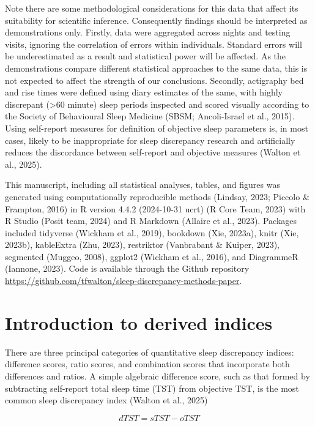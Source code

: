 \documentclass[
]{article}
\begin{document}
Note there are some methodological considerations for this data that affect its suitability for scientific inference. Consequently findings should be interpreted as demonstrations only. Firstly, data were aggregated across nights and testing visits, ignoring the correlation of errors within individuals. Standard errors will be underestimated as a result and statistical power will be affected. As the demonstrations compare different statistical approaches to the same data, this is not expected to affect the strength of our conclusions. Secondly, actigraphy bed and rise times were defined using diary estimates of the same, with highly discrepant (\textgreater60 minute) sleep periods inspected and scored visually according to the Society of Behavioural Sleep Medicine (SBSM; Ancoli-Israel et al., 2015). Using self-report measures for definition of objective sleep parameters is, in most cases, likely to be inappropriate for sleep discrepancy research and artificially reduces the discordance between self-report and objective measures (Walton et al., 2025).

This manuscript, including all statistical analyses, tables, and figures was generated using computationally reproducible methods (Lindsay, 2023; Piccolo \& Frampton, 2016) in R version 4.4.2 (2024-10-31 ucrt) (R Core Team, 2023) with R Studio (Posit team, 2024) and R Markdown (Allaire et al., 2023). Packages included tidyverse (Wickham et al., 2019), bookdown (Xie, 2023a), knitr (Xie, 2023b), kableExtra (Zhu, 2023), restriktor (Vanbrabant \& Kuiper, 2023), segmented (Muggeo, 2008), ggplot2 (Wickham et al., 2016), and DiagrammeR (Iannone, 2023). Code is available through the Github repository \url{https://github.com/tfwalton/sleep-discrepancy-methods-paper}.

\section{Introduction to derived indices}\label{introduction-to-derived-indices}

There are three principal categories of quantitative sleep discrepancy indices: difference scores, ratio scores, and combination scores that incorporate both differences and ratios. A simple algebraic difference score, such as that formed by subtracting self-report total sleep time (TST) from objective TST, is the most common sleep discrepancy index (Walton et al., 2025)

\begin{equation}
dTST = sTST - oTST
\label{eq:dTST}
\end{equation}
\end{document}
